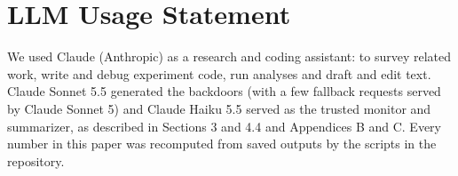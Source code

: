 \documentclass[11pt,letterpaper]{article}
\begin{document}
\section*{LLM Usage Statement}

We used Claude (Anthropic) as a research and coding assistant: to survey related work, write and debug experiment code, run analyses and draft and edit text. Claude Sonnet 5.5 generated the backdoors (with a few fallback requests served by Claude Sonnet 5) and Claude Haiku 5.5 served as the trusted monitor and summarizer, as described in Sections 3 and 4.4 and Appendices B and C. Every number in this paper was recomputed from saved outputs by the scripts in the repository.
\end{document}
